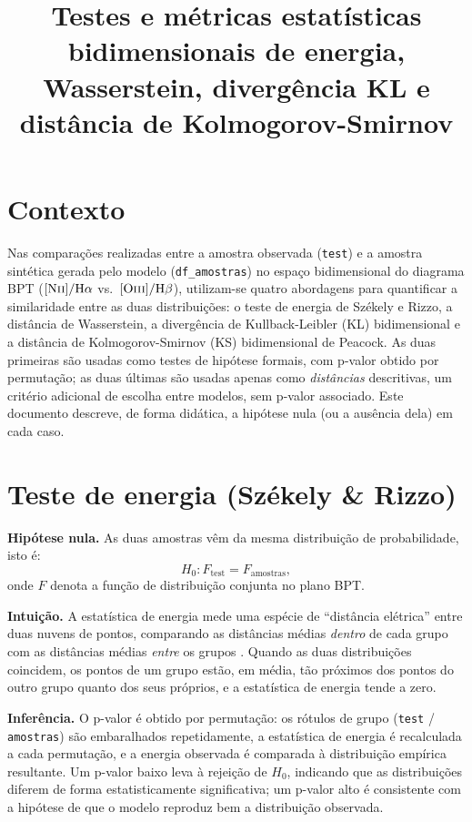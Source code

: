 \documentclass[11pt,a4paper]{article}
\title{Testes e métricas estatísticas bidimensionais de energia, Wasserstein, divergência KL e distância de Kolmogorov-Smirnov}
\author{}
\date{}
\begin{document}
\maketitle

\section{Contexto}

Nas comparações realizadas entre a amostra observada (\texttt{test}) e a
amostra sintética gerada pelo modelo (\texttt{df\_amostras}) no espaço
bidimensional do diagrama BPT (\([\mathrm{N\textsc{ii}}]/\mathrm{H}\alpha\)
vs.\ \([\mathrm{O\textsc{iii}}]/\mathrm{H}\beta\)), utilizam-se quatro
abordagens para quantificar a similaridade entre as duas distribuições:
o teste de energia de Székely e Rizzo, a distância de Wasserstein, a
divergência de Kullback-Leibler (KL) bidimensional e a distância de
Kolmogorov-Smirnov (KS) bidimensional de Peacock. As duas primeiras são
usadas como testes de hipótese formais, com p-valor obtido por
permutação; as duas últimas são usadas apenas como \emph{distâncias}
descritivas, um critério adicional de escolha entre modelos, sem
p-valor associado. Este documento descreve, de forma didática, a
hipótese nula (ou a ausência dela) em cada caso.

\section{Teste de energia (Székely \& Rizzo)}

\textbf{Hipótese nula.} As duas amostras vêm da mesma
distribuição de probabilidade, isto é:
\[
H_0: F_{\text{test}} = F_{\text{amostras}},
\]
onde $F$ denota a função de distribuição conjunta no plano BPT.

\textbf{Intuição.} A estatística de energia mede uma espécie de
``distância elétrica'' entre duas nuvens de pontos, comparando as
distâncias médias \emph{dentro} de cada grupo com as distâncias médias
\emph{entre} os grupos \cite{szekely2004,szekely2013}. Quando as duas
distribuições coincidem, os pontos de um grupo estão, em média, tão
próximos dos pontos do outro grupo quanto dos seus próprios, e a
estatística de energia tende a zero.

\textbf{Inferência.} O p-valor é obtido por permutação: os rótulos de
grupo (\texttt{test} / \texttt{amostras}) são embaralhados repetidamente,
a estatística de energia é recalculada a cada permutação, e a energia
observada é comparada à distribuição empírica resultante. Um p-valor
baixo leva à rejeição de $H_0$, indicando que as distribuições diferem
de forma estatisticamente significativa; um p-valor alto é consistente
com a hipótese de que o modelo reproduz bem a distribuição observada.
\end{document}
